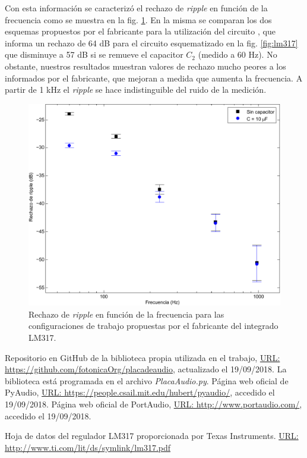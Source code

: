 \documentclass[a4paper,11pt]{article}
\begin{document}
Con esta información se caracterizó el rechazo de \textit{ripple} en función de la frecuencia como se muestra en la fig. \ref{fig:rechazo}. En la misma se comparan los dos esquemas propuestos por el fabricante para la utilización del circuito \cite{datasheetlm317}, que informa un rechazo de 64 dB para el circuito esquematizado en la fig. \ref{fig:lm317} que disminuye a 57 dB si se remueve el capacitor $C_2$ (medido a 60 Hz). No obstante, nuestros resultados muestran valores de rechazo mucho peores a los informados por el fabricante, que mejoran a medida que aumenta la frecuencia. A partir de 1 kHz el \textit{ripple} se hace indistinguible del ruido de la medición.

	\begin{figure}[h]
		\centering
		\includegraphics[width=\textwidth]{imagenes/rechazoriple.pdf}
		\caption{Rechazo de \textit{ripple} en función de la frecuencia para las configuraciones de trabajo propuestas por el fabricante del integrado LM317.}
		\label{fig:rechazo}
	\end{figure}

\clearpage

\begin{thebibliography}{99}

	 Repositorio en GitHub de la biblioteca propia utilizada en el trabajo, \href{https://github.com/fotonicaOrg/placadeaudio}{URL: https://github.com/fotonicaOrg/placadeaudio}, actualizado el 19/09/2018. La biblioteca está programada en el archivo \emph{PlacaAudio.py}.
	 Página web oficial de PyAudio, \href{https://people.csail.mit.edu/hubert/pyaudio/}{URL: https://people.csail.mit.edu/hubert/pyaudio/}, accedido el 19/09/2018.
	 Página web oficial de PortAudio, \href{http://www.portaudio.com/}{URL: http://www.portaudio.com/}, accedido el 19/09/2018.
	
	 Hoja de datos del regulador LM317 proporcionada por Texas Instruments.  \href{http://www.ti.com/lit/ds/symlink/lm317.pdf}{URL: http://www.ti.com/lit/ds/symlink/lm317.pdf}

\end{thebibliography}
\end{document}
